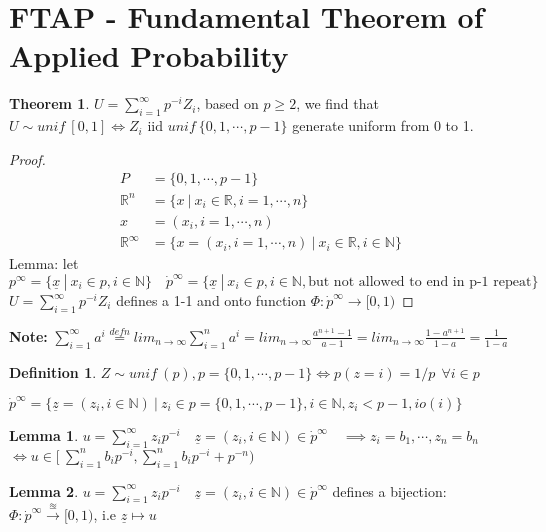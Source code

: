 \documentclass{article}
\theoremstyle{definition}
\newtheorem{definition}{Definition}[section]
\theoremstyle{thrm}
\newtheorem{thrm}{Theorem}[section]
\theoremstyle{lma}
\newtheorem{lma}{Lemma}[section]
\theoremstyle{ppst}
\theoremstyle{crlr}
\begin{document}
\section{FTAP - Fundamental Theorem of Applied Probability}
\begin{thrm}
	$U = \sum_{i=1}^\infty p^{-i}Z_i$, based on $p\geq 2$, we find that $U\sim unif\ [0,1] \iff Z_i \text{ iid } unif\ \{0,1,\cdots,p-1\}$ generate uniform from 0 to 1. 
\end{thrm}
\begin{proof}
	\begin{align*}
		P &= \{0,1,\cdots, p-1\}\\
		\mathbb{R}^n &= \{x\ |\ x_i \in \mathbb{R}, i =1, \cdots, n\}\\
		x &= (x_i, i = 1,\cdots, n)\\
		\mathbb{R}^\infty &= \{x = (x_i, i = 1,\cdots, n)\ | \ x_i\in \mathbb{R}, i \in \mathbb{N}\}
	\end{align*}
	Lemma: let $p^\infty = \{\underline{x}\ |\ x_i \in p, i \in \mathbb{N}\}\quad \dot{p}^\infty = \{\underline{x}\ |\ x_i \in p, i \in \mathbb{N},\text{but not allowed to end in p-1 repeat}\}$\\
	$U = \sum_{i=1}^\infty p^{-i}Z_i$ defines a 1-1 and onto  function $\Phi: \dot{p}^\infty \to [0,1)$
\end{proof}
\textbf{Note:} $\sum_{i=1}^\infty a^i \stackrel{defn}{=} lim_{n\to\infty}\sum_{i=1}^n a^i = lim_{n\to\infty}\frac{a^{n+1}-1}{a-1} = lim_{n\to\infty}\frac{1-a^{n+1}}{1-a} = \frac{1}{1-a}$\\ 
\begin{definition}
	$Z\sim unif\ (p), p = \{0,1,\cdots, p-1\} \iff p(z=i) = 1/p \ \   \forall i \in p$
\end{definition}
$\dot{p}^\infty = \{\underline{z} = (z_i, i\in\mathbb{N})\ | \ z_i \in p = \{0,1,\cdots, p-1\},i \in \mathbb{N}, z_i < p-1, io(i)\}$
\begin{lma}
	$u=\sum_{i=1}^\infty z_ip^{-i} \quad \underline{z} = (z_i, i\in\mathbb{N})\in \dot{p}^\infty\quad \implies z_i = b_1, \cdots, z_n = b_n$\\
	$ \iff u \in [\ \sum_{i=1}^n b_ip^{-i}, \sum_{i=1}^n b_ip^{-i}+p^{-n})$
\end{lma}
\begin{lma}
	$u=\sum_{i=1}^\infty z_ip^{-i} \quad \underline{z} = (z_i, i\in\mathbb{N})\in \dot{p}^\infty$ defines a bijection: $\Phi: \dot{p}^\infty \stackrel{\approxeq}{\rightarrow}[0,1)$, i.e $\underline{z}\mapsto u$
\end{lma}
\end{document}
